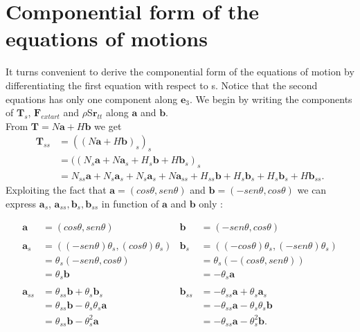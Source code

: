

\section{Componential form of the equations of motions}\label{componential-form-of-the-equations-of-motion}
It turns convenient to derive the componential form of the equations of motion by differentiating the first equation with respect to s.
Notice that the second equations has only one component along $\mathbf{e}_3$.
We begin by writing the components of $\mathbf{T}_s$, $\mathbf{F}_{extart}$ and $\rho$S$\mathbf{r}_{tt}$ along $\mathbf{a}$ and $\mathbf{b}$.\\
From $\mathbf{T}=N\mathbf{a}+H\mathbf{b}$ we get
\begin{equation}
\begin{split}
\mathbf{T}_{ss}& =((N\mathbf{a}+H\mathbf{b})_s)_s\\
               & =((N_s\mathbf{a}+ N\mathbf{a}_s + H_s\mathbf{b} + H\mathbf{b}_s)_s\\
               & = N_{ss}\mathbf{a} + N_s\mathbf{a}_s + N_s\mathbf{a}_s + N\mathbf{a}_{ss} + H_{ss}\mathbf{b} + H_s\mathbf{b}_s + H_s\mathbf{b}_s + H\mathbf{b}_{ss}.
\end{split}
\end{equation}
Exploiting the fact that $\mathbf{a}=(cos\theta, sen\theta)$ and $\mathbf{b}=(-sen\theta, cos\theta)$ we can express $\mathbf{a}_s$, $\mathbf{a}_{ss}, \mathbf{b}_s, \mathbf{b}_{ss}$ in function of $\mathbf{a}$ and $\mathbf{b}$ only :

\begin{align}
\mathbf{a}   & = (cos\theta,sen\theta)                        &\mathbf{b}& = (-sen\theta, cos\theta)\\\\
\mathbf{a}_s & = ((-sen\theta)\theta_s, (cos\theta)\theta_s)  &\mathbf{b}_s& = ((-cos\theta)\theta_s, (-sen\theta)\theta_s)\\
             & = \theta_s(-sen\theta, cos\theta)              & &= \theta_s(-(cos\theta, sen\theta))\\
             & =\theta_s\mathbf{b}                            & &= -\theta_s\mathbf{a}\\\\
\mathbf{a}_{ss}& = \theta_{ss}\mathbf{b}+\theta_s\mathbf{b}_s & 
\mathbf{b}_{ss}& = -\theta_{ss}\mathbf{a}+\theta_s\mathbf{a}_s\\
               & = \theta_{ss}\mathbf{b} - \theta_s\theta_s\mathbf{a} & &= -\theta_{ss}\mathbf{a} -\theta_s\theta_s\mathbf{b}\\
               & = \theta_{ss}\mathbf{b} - \theta_s^2\mathbf{a} & &= -\theta_{ss}\mathbf{a} -\theta_s^2\mathbf{b}.\\
               
\end{align}

 
 
 
 
 
 
  
  
  
  
  
  
  
  
  
  
  
  
  
  
  
  
  
  